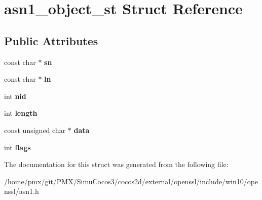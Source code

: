 \hypertarget{structasn1__object__st}{}\section{asn1\+\_\+object\+\_\+st Struct Reference}
\label{structasn1__object__st}
\subsection*{Public Attributes}
\begin{DoxyCompactItemize}
\item 
\mbox{\label{structasn1__object__st_a354a9532f5135bf342293f28af850177}} 
const char $\ast$ {\bfseries sn}
\item 
\mbox{\label{structasn1__object__st_a02d44fa6f642b789372cf8f57f7f0f12}} 
const char $\ast$ {\bfseries ln}
\item 
\mbox{\label{structasn1__object__st_a1506f26770df5e823c217dea262bd64f}} 
int {\bfseries nid}
\item 
\mbox{\label{structasn1__object__st_aebd85f3c9bec7ccf21ce77aa71c78ce1}} 
int {\bfseries length}
\item 
\mbox{\label{structasn1__object__st_a076f159c5190422adbe799dc10aa8ebe}} 
const unsigned char $\ast$ {\bfseries data}
\item 
\mbox{\label{structasn1__object__st_adfe42f89b19fcc6da297e98a54c57ac6}} 
int {\bfseries flags}
\end{DoxyCompactItemize}


The documentation for this struct was generated from the following file\+:\begin{DoxyCompactItemize}
\item 
/home/pmx/git/\+P\+M\+X/\+Simu\+Cocos3/cocos2d/external/openssl/include/win10/openssl/asn1.\+h\end{DoxyCompactItemize}

